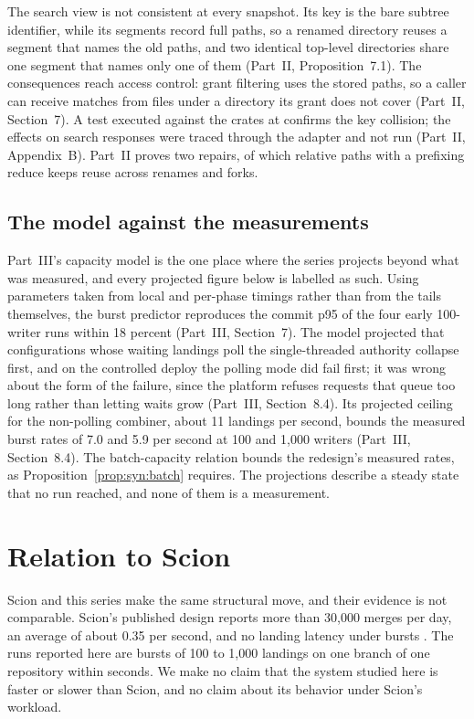 \documentclass[11pt,letterpaper]{article}
\theoremstyle{definition}
\theoremstyle{remark}
\begin{document}
The search view is not consistent at every snapshot. Its key is the bare subtree identifier, while its segments record full paths, so a renamed directory reuses a segment that names the old paths, and two identical top-level directories share one segment that names only one of them (Part~II, Proposition~7.1). The consequences reach access control: grant filtering uses the stored paths, so a caller can receive matches from files under a directory its grant does not cover (Part~II, Section~7). A test executed against the crates at  confirms the key collision; the effects on search responses were traced through the adapter and not run (Part~II, Appendix~B). Part~II proves two repairs, of which relative paths with a prefixing reduce keeps reuse across renames and forks.

\subsection{The model against the measurements}

Part~III's capacity model is the one place where the series projects beyond what was measured, and every projected figure below is labelled as such. Using parameters taken from local and per-phase timings rather than from the tails themselves, the burst predictor reproduces the commit p95 of the four early 100-writer runs within 18 percent (Part~III, Section~7). %
The model projected that configurations whose waiting landings poll the single-threaded authority collapse first, and on the controlled deploy the polling mode did fail first; it was wrong about the form of the failure, since the platform refuses requests that queue too long rather than letting waits grow (Part~III, Section~8.4). %
Its projected ceiling for the non-polling combiner, about 11 landings per second, bounds the measured burst rates of 7.0 and 5.9 per second at 100 and 1,000 writers (Part~III, Section~8.4). %
The batch-capacity relation bounds the redesign's measured rates, as Proposition~\ref{prop:syn:batch} requires. The projections describe a steady state that no run reached, and none of them is a measurement.

\section{Relation to Scion}
\label{sec:syn:scion}

Scion and this series make the same structural move, and their evidence is not comparable. Scion's published design reports more than 30,000 merges per day, an average of about 0.35 per second, and no landing latency under bursts \cite{anthropic2026scion}. %
The runs reported here are bursts of 100 to 1,000 landings on one branch of one repository within seconds. %
 We make no claim that the system studied here is faster or slower than Scion, and no claim about its behavior under Scion's workload.
\end{document}
